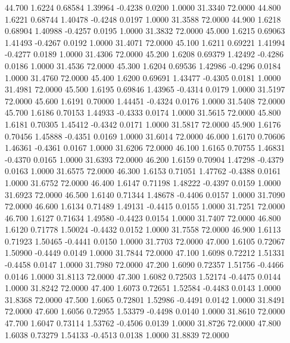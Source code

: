   44.700   1.6224   0.68584   1.39964  -0.4238   0.0200   1.0000  31.3340  72.0000
  44.800   1.6221   0.68744   1.40478  -0.4248   0.0197   1.0000  31.3588  72.0000
  44.900   1.6218   0.68904   1.40988  -0.4257   0.0195   1.0000  31.3832  72.0000
  45.000   1.6215   0.69063   1.41493  -0.4267   0.0192   1.0000  31.4071  72.0000
  45.100   1.6211   0.69221   1.41994  -0.4277   0.0189   1.0000  31.4306  72.0000
  45.200   1.6208   0.69379   1.42492  -0.4286   0.0186   1.0000  31.4536  72.0000
  45.300   1.6204   0.69536   1.42986  -0.4296   0.0184   1.0000  31.4760  72.0000
  45.400   1.6200   0.69691   1.43477  -0.4305   0.0181   1.0000  31.4981  72.0000
  45.500   1.6195   0.69846   1.43965  -0.4314   0.0179   1.0000  31.5197  72.0000
  45.600   1.6191   0.70000   1.44451  -0.4324   0.0176   1.0000  31.5408  72.0000
  45.700   1.6186   0.70153   1.44933  -0.4333   0.0174   1.0000  31.5615  72.0000
  45.800   1.6181   0.70305   1.45412  -0.4342   0.0171   1.0000  31.5817  72.0000
  45.900   1.6176   0.70456   1.45888  -0.4351   0.0169   1.0000  31.6014  72.0000
  46.000   1.6170   0.70606   1.46361  -0.4361   0.0167   1.0000  31.6206  72.0000
  46.100   1.6165   0.70755   1.46831  -0.4370   0.0165   1.0000  31.6393  72.0000
  46.200   1.6159   0.70904   1.47298  -0.4379   0.0163   1.0000  31.6575  72.0000
  46.300   1.6153   0.71051   1.47762  -0.4388   0.0161   1.0000  31.6752  72.0000
  46.400   1.6147   0.71198   1.48222  -0.4397   0.0159   1.0000  31.6923  72.0000
  46.500   1.6140   0.71344   1.48678  -0.4406   0.0157   1.0000  31.7090  72.0000
  46.600   1.6134   0.71489   1.49131  -0.4415   0.0155   1.0000  31.7251  72.0000
  46.700   1.6127   0.71634   1.49580  -0.4423   0.0154   1.0000  31.7407  72.0000
  46.800   1.6120   0.71778   1.50024  -0.4432   0.0152   1.0000  31.7558  72.0000
  46.900   1.6113   0.71923   1.50465  -0.4441   0.0150   1.0000  31.7703  72.0000
  47.000   1.6105   0.72067   1.50900  -0.4449   0.0149   1.0000  31.7844  72.0000
  47.100   1.6098   0.72212   1.51331  -0.4458   0.0147   1.0000  31.7980  72.0000
  47.200   1.6090   0.72357   1.51756  -0.4466   0.0146   1.0000  31.8113  72.0000
  47.300   1.6082   0.72503   1.52174  -0.4475   0.0144   1.0000  31.8242  72.0000
  47.400   1.6073   0.72651   1.52584  -0.4483   0.0143   1.0000  31.8368  72.0000
  47.500   1.6065   0.72801   1.52986  -0.4491   0.0142   1.0000  31.8491  72.0000
  47.600   1.6056   0.72955   1.53379  -0.4498   0.0140   1.0000  31.8610  72.0000
  47.700   1.6047   0.73114   1.53762  -0.4506   0.0139   1.0000  31.8726  72.0000
  47.800   1.6038   0.73279   1.54133  -0.4513   0.0138   1.0000  31.8839  72.0000
